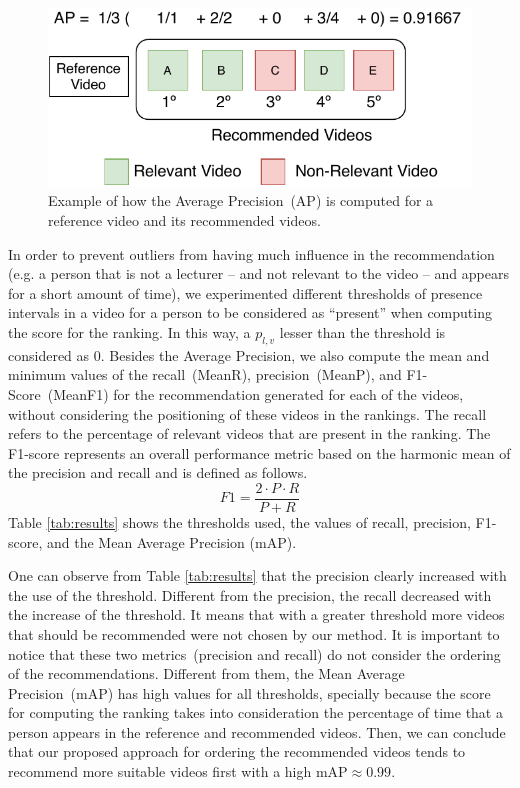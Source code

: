 \begin{figure}[ht]
  \centering
  \includegraphics[width=0.7\linewidth]{img/video_recommendation/ap_example.pdf}
  \caption{Example of how the Average Precision~(AP) is computed for a reference video and its recommended videos.}
  \label{fig:ap_example}
\end{figure}

In order to prevent outliers from having much influence in the recommendation (e.g. a person that is not a lecturer -- and not relevant to the video -- and appears for a short amount of time), we experimented different thresholds of presence intervals in a video for a person to be considered as ``present'' when computing the score for the ranking. 
In this way, a $p_{l,v}$ lesser than the threshold is considered as $0$.
Besides the Average Precision, we also compute the mean and minimum values of the recall~(MeanR), precision~(MeanP), and F1-Score~(MeanF1) for the recommendation generated for each of the videos, without considering the positioning of these videos in the rankings.
The recall refers to the percentage of relevant videos that are present in the ranking.
The F1-score represents an overall performance metric based on the  harmonic mean of the precision and recall and is defined as follows.
\begin{equation}
    \label{equation:f1}
    F1 = \frac{2 \cdot P \cdot R}{P + R}
\end{equation}
Table \ref{tab:results} shows the thresholds used, the values of recall, precision, F1-score, and the Mean Average Precision (mAP).

One can observe from Table \ref{tab:results} that the precision clearly increased with the use of the threshold.
Different from the precision, the recall decreased with the increase of the threshold. It means that with a greater threshold more videos that should be recommended were not chosen by our method.
It is important to notice that these two metrics~(precision and recall) do not consider the ordering of the recommendations.
Different from them, the Mean Average Precision~(mAP) has high values for all thresholds, specially because the score for computing the ranking takes into consideration the percentage of time that a person appears in the reference and recommended videos.
Then, we can conclude that our proposed approach for ordering the recommended videos tends to recommend more suitable videos first with a high mAP$\approx0.99$. 

